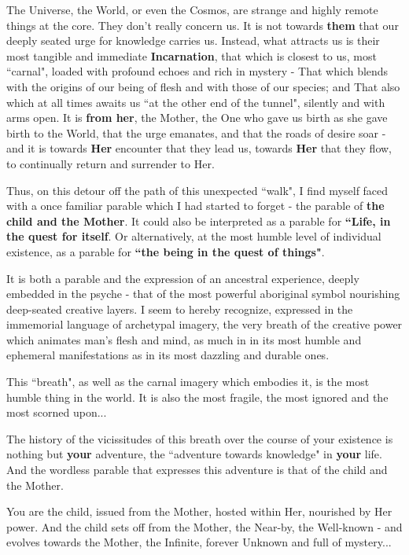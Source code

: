 The Universe, the World, or even the Cosmos, are strange and highly remote things at the core. They don't really concern us. It is not towards \textbf{them} that our deeply seated urge for knowledge carries us. Instead, what attracts us is their most tangible and immediate \textbf{Incarnation}, that which is closest to us, most ``carnal", loaded with profound echoes and rich in mystery - That which blends with the origins of our being of flesh and with those of our species; and That also which at all times awaits us ``at the other end of the tunnel", silently and with arms open. It is \textbf{from her}, the Mother, the One who gave us birth as she gave birth to the World, that the urge emanates, and that the roads of desire soar - and it is towards \textbf{Her} encounter that they lead us, towards \textbf{Her} that they flow, to continually return and surrender to Her.

Thus, on this detour off the path of this unexpected ``walk", I find myself faced with a once familiar parable which I had started to forget - the parable of \textbf{the child and the Mother}. It could also be interpreted as a parable for \textbf{``Life, in the quest for itself}. Or alternatively, at the most humble level of individual existence, as a parable for \textbf{``the being in the quest of things"}. 

It is both a parable and the expression of an ancestral experience, deeply embedded in the psyche - that of the most powerful aboriginal symbol nourishing deep-seated creative layers. I seem to hereby recognize, expressed in the immemorial language of archetypal imagery, the very breath of the creative power which animates man's flesh and mind, as much in in its most humble and ephemeral manifestations as in its most dazzling and durable ones. 

This ``breath", as well as the carnal imagery which embodies it, is the most humble thing in the world. It is also the most fragile, the most ignored and the most scorned upon...

The history of the vicissitudes of this breath over the course of your existence is nothing but \textbf{your} adventure, the ``adventure towards knowledge" in \textbf{your} life. And the wordless parable that expresses this adventure is that of the child and the Mother.

You are the child, issued from the Mother, hosted within Her, nourished by Her power. And the child sets off from the Mother, the Near-by, the Well-known - and evolves towards the Mother, the Infinite, forever Unknown and full of mystery...

